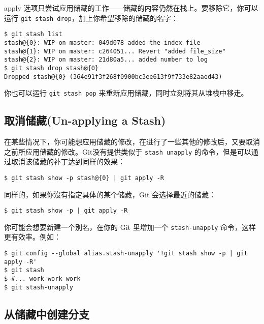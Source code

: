 \documentclass[a4paper]{book}
\begin{document}
apply 选项只尝试应用储藏的工作------储藏的内容仍然在栈上。要移除它，你可以运行 \texttt{git stash drop}，加上你希望移除的储藏的名字：

\begin{shaded}\begin{verbatim}
$ git stash list
stash@{0}: WIP on master: 049d078 added the index file
stash@{1}: WIP on master: c264051... Revert "added file_size"
stash@{2}: WIP on master: 21d80a5... added number to log
$ git stash drop stash@{0}
Dropped stash@{0} (364e91f3f268f0900bc3ee613f9f733e82aaed43)
\end{verbatim}\end{shaded}

你也可以运行 \texttt{git stash pop} 来重新应用储藏，同时立刻将其从堆栈中移走。

\subsection{取消储藏(Un-applying a Stash)}

在某些情况下，你可能想应用储藏的修改，在进行了一些其他的修改后，又要取消之前所应用储藏的修改。Git没有提供类似于 \texttt{stash unapply} 的命令，但是可以通过取消该储藏的补丁达到同样的效果：

\begin{shaded}\begin{verbatim}
$ git stash show -p stash@{0} | git apply -R
\end{verbatim}\end{shaded}

同样的，如果你沒有指定具体的某个储藏，Git 会选择最近的储藏：

\begin{shaded}\begin{verbatim}
$ git stash show -p | git apply -R
\end{verbatim}\end{shaded}

你可能会想要新建一个別名，在你的 Git 里增加一个 \texttt{stash-unapply} 命令，这样更有效率。例如：

\begin{shaded}\begin{verbatim}
$ git config --global alias.stash-unapply '!git stash show -p | git apply -R'
$ git stash
$ #... work work work
$ git stash-unapply
\end{verbatim}\end{shaded}

\subsection{从储藏中创建分支}
\end{document}
